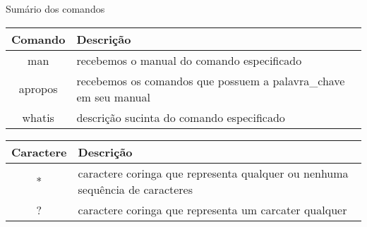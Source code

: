 \documentclass{beamer}
\begin{document}
\begin{frame}{Sumário dos comandos}
 \begin{center}
 \begin{tabular}{||c | p{9cm}||} 
 \hline
 \textbf{Comando} & \textbf{Descri\c{c}ão}\\ [0.5ex] 
 \hline\hline
 man & recebemos o manual do comando especificado\\ 
 \hline
 apropos & recebemos os comandos que possuem a palavra\_chave em seu manual\\
 \hline
 whatis & descri\c{c}ão sucinta do comando especificado\\
 \hline
\end{tabular}
\end{center}

 \begin{center}
 \begin{tabular}{||c | p{9cm}||} 
 \hline
 \textbf{Caractere} & \textbf{Descri\c{c}ão}\\ [0.5ex] 
 \hline\hline
 * & caractere coringa que representa qualquer ou nenhuma sequência de caracteres\\ 
 \hline
 ? & caractere coringa que representa um carcater qualquer\\
 \hline
\end{tabular}
\end{center}
\end{frame}
\end{document}
